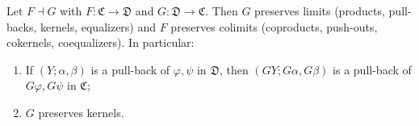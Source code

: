 Let $F \dashv G$ with $F: \mathfrak{C} \to \mathfrak{D}$ and $G: \mathfrak{D} \to \mathfrak{C}$. Then $G$ preserves limits (products, pull-backs, kernels, equalizers) and $F$ preserves colimits (coproducts, push-outs, cokernels, coequalizers). In particular:
\begin{enumerate}
\item[(i)] If $(Y; \alpha, \beta)$ is a pull-back of $\varphi, \psi$ in $\mathfrak{D}$, then $(GY; G\alpha, G\beta)$ is a pull-back of $G\varphi, G\psi$ in $\mathfrak{C}$;
\item[(ii)] $G$ preserves kernels.
\end{enumerate}

